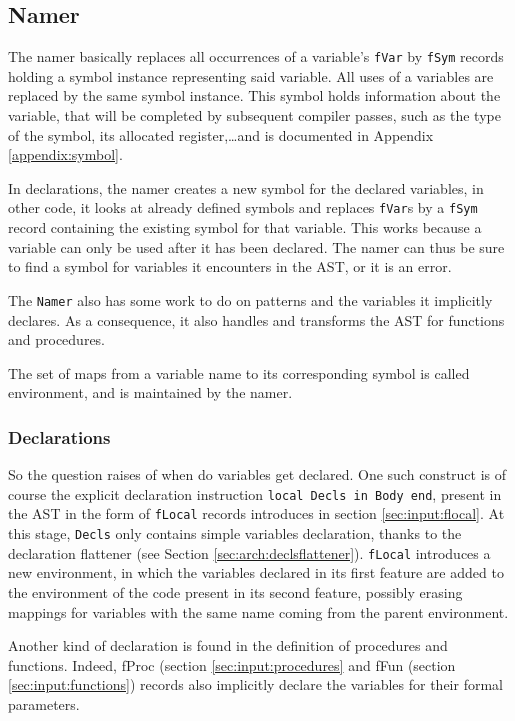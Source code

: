 \documentclass[a4paper]{memoir}
\begin{document}
\subsection{Namer}\label{sec:arch:namer}
The namer  basically replaces all occurrences of a variable's \lstinline!fVar! by \lstinline!fSym! records holding a symbol instance representing said variable. All uses of a variables are replaced by the same symbol instance. This symbol holds information about the variable, that will be completed by subsequent compiler passes, such as the type of the symbol, its allocated register,\ldots and is documented in Appendix \ref{appendix:symbol}.

In declarations, the namer creates a new symbol for the declared variables, in other code, it looks at already defined symbols and replaces \lstinline!fVar!s by a \lstinline!fSym! record containing the existing symbol for that variable. This works because a variable can only be used after it has been declared. The namer can thus be sure to find a symbol for variables it encounters in the AST, or it is an error.

The \lstinline!Namer! also has some work to do on patterns and the variables it
implicitly declares. As a consequence, it also handles and transforms the AST
for functions and procedures.

The set of maps from a variable name to its corresponding symbol is called environment, and is maintained by the namer.


\subsubsection{Declarations}
So the question raises of when do variables get declared.
One such construct is of course the explicit declaration instruction \lstinline!local Decls in Body end!, present in the AST in the form of \lstinline!fLocal! records introduces in section \ref{sec:input:flocal}. At this stage, \lstinline!Decls! only contains simple variables declaration, thanks to the declaration flattener (see Section \ref{sec:arch:declsflattener}). \lstinline!fLocal! introduces a new environment, in which the variables declared in its first feature are added to the environment of the code present in its second feature, possibly erasing mappings for variables with the same name coming from the parent environment. 

Another kind of declaration is found in the definition of procedures and functions. Indeed, fProc (section \ref{sec:input:procedures} and fFun (section \ref{sec:input:functions}) records also implicitly declare the variables for their formal parameters. %
\end{document}
